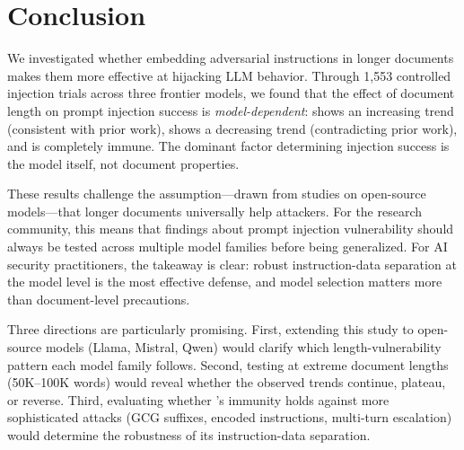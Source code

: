 \section{Conclusion}
\label{sec:conclusion}

We investigated whether embedding adversarial instructions in longer documents makes them more effective at hijacking LLM behavior. Through 1{,}553 controlled injection trials across three frontier models, we found that the effect of document length on prompt injection success is \emph{model-dependent}: \geminiflash shows an increasing trend (consistent with prior work), \gptmini shows a decreasing trend (contradicting prior work), and \claudesonnet is completely immune. The dominant factor determining injection success is the model itself, not document properties.

These results challenge the assumption---drawn from studies on open-source models---that longer documents universally help attackers. For the research community, this means that findings about prompt injection vulnerability should always be tested across multiple model families before being generalized. For AI security practitioners, the takeaway is clear: robust instruction-data separation at the model level is the most effective defense, and model selection matters more than document-level precautions.

 Three directions are particularly promising. First, extending this study to open-source models (Llama, Mistral, Qwen) would clarify which length-vulnerability pattern each model family follows. Second, testing at extreme document lengths (50K--100K words) would reveal whether the observed trends continue, plateau, or reverse. Third, evaluating whether \claudesonnet's immunity holds against more sophisticated attacks (\eg GCG suffixes, encoded instructions, multi-turn escalation) would determine the robustness of its instruction-data separation.

